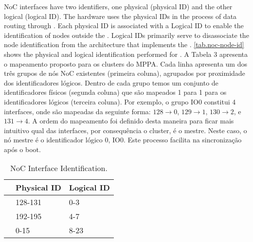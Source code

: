 		NoC interfaces have two identifiers, one physical (physical ID) and the other logical (logical ID).
		The hardware uses the physical IDs in the process of data routing through \noc.
		Each physical ID is associated with a Logical ID to enable the identification
		of \noc nodes outside the \hal.
		Logical IDs primarily serve to disassociate the node identification from the
		architecture that implements the \hal.
			\autoref{tab.noc-node-id} shows the physical and logical identification performed for \mppa.
		A Tabela 3 apresenta o mapeamento proposto para os clusters do MPPA.
		Cada linha apresenta um dos três grupos de nós NoC existentes (primeira coluna), agrupados por proximidade dos identificadores lógicos.
		Dentro de cada grupo temos um conjunto de identificadores físicos (segunda coluna) que são mapeados 1 para 1 para os identificadores lógicos (terceira coluna).
		Por exemplo, o grupo IO0 constitui 4 interfaces, onde são mapeadas da seguinte forma: $128 \to 0$, $129 \to 1$, $130 \to 2$, e $131 \to 4$.
		A ordem do mapeamento foi definido desta maneira para ficar mais intuitivo qual das interfaces, por consequência o cluster, é o mestre.
		Neste caso, o nó mestre é o identificador lógico 0, IO0.
		Este processo facilita na sincronização após o boot.

		\begin{table}[!tb]
			\centering%
			\caption{NoC Interface Identification.}%
			\label{tab.noc-node-id}%

			\begin{tabular}{l|l|l|}
				\cline{2-3}
									                       & \textbf{Physical ID} & \textbf{Logical ID} \\ \hline
				\multicolumn{1}{|l|}{\textbf{\iocluster0}} & 128-131              & 0-3                 \\ \hline
				\multicolumn{1}{|l|}{\textbf{\iocluster1}} & 192-195              & 4-7                 \\ \hline
				\multicolumn{1}{|l|}{\textbf{\ccluster}}   & 0-15                 & 8-23                \\ \hline
			\end{tabular}

		\end{table}

